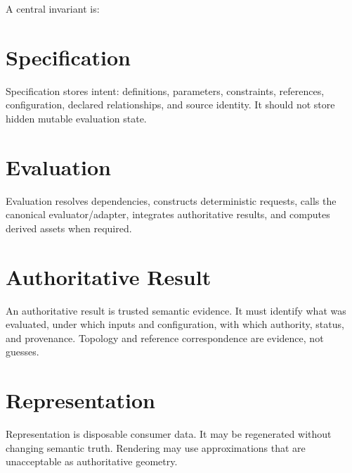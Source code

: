 \documentclass[11pt,a4paper]{report}
\begin{document}
A central invariant is:

\begin{center}
\end{center}

\section{Specification}
Specification stores intent: definitions, parameters, constraints, references, configuration, declared relationships, and source identity. It should not store hidden mutable evaluation state.

\section{Evaluation}
Evaluation resolves dependencies, constructs deterministic requests, calls the canonical evaluator/adapter, integrates authoritative results, and computes derived assets when required.

\section{Authoritative Result}
An authoritative result is trusted semantic evidence. It must identify what was evaluated, under which inputs and configuration, with which authority, status, and provenance. Topology and reference correspondence are evidence, not guesses.

\section{Representation}
Representation is disposable consumer data. It may be regenerated without changing semantic truth. Rendering may use approximations that are unacceptable as authoritative geometry.
\end{document}
